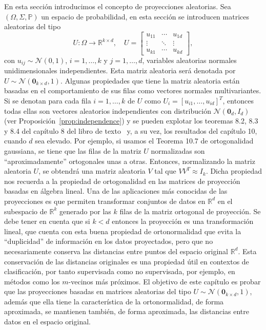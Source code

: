 En esta sección introducimos el concepto de proyecciones aleatorias.
Sea $\left(\Omega,\Sigma,\mathbb{P}\right)$ un espacio de
probabilidad, en esta sección se introducen matrices aleatorias del
tipo
\begin{equation*}
	U\colon\Omega\to\mathbb{R}^{k\times d},\quad
	U=
	\begin{bmatrix}
		u_{11} & \cdots & u_{1d} \\
		\vdots & \ddots & \vdots \\
		u_{k1} & \cdots & u_{kd}
	\end{bmatrix},
\end{equation*}
con $u_{ij}\sim\mathcal{N}\left(0,1\right)$, $i=1,\dotsc, k$ y
$j=1,\dotsc,d$, variables aleatorias normales unidimensionales
independientes.
Esta matriz aleatoria será denotada por
$U\sim\mathcal{N}\left(\symbf{0}_{k\times d},1\right)$.
Algunas propiedades que tiene la matriz aleatoria están basadas en el
comportamiento de sus filas como vectores normales multivariantes.
Si se denotan para cada fila $i=1,\dotsc,k$ de $U$ como
$U_{i}={\left[u_{i1},\dotsc,u_{id}\right]}^{T}$, entonces todas
ellas son vectores aleatorios independientes con distribución
$\mathcal{N}\left(\symbf{0}_{d},I_{d}\right)$
(ver Proposición~\ref{prop:independence}) y se pueden explotar los
teoremas 8.2, 8.3 y 8.4 del capítulo 8 del libro de
texto~\cite{Wegner2024} y, a su vez, los resultados del capítulo 10,
cuando $d$ sea elevado.
Por ejemplo, si usamos el Teorema 10.7 de ortogonalidad gaussiana, se
tiene que las filas de la matriz $U$ normalizadas son
``aproximadamente'' ortogonales unas a otras.
Entonces, normalizando la matriz aleatoria $U$, se obtendrá una
matriz aleatoria $V$ tal que $VV^{T}≈I_{k}$.
Dicha propiedad nos recuerda a la propiedad de ortogonalidad en las
matrices de proyección basadas en álgebra lineal.
Una de las aplicaciones más conocidas de las proyecciones es que
permiten transformar conjuntos de datos en $\mathbb{R}^{d}$ en el
subespacio de $\mathbb{R}^{k}$ generado por las $k$ filas de la
matriz ortogonal de proyección.
Se debe tener en cuenta que si $k<d$ entonces la proyección es una
transformación lineal, que cuenta con esta buena propiedad de
ortonormalidad que evita la ``duplicidad'' de información en los
datos proyectados, pero que no necesariamente conserva las distancias
entre puntos del espacio original $\mathbb{R}^{d}$.
Esta conservación de las distancias originales es una propiedad útil
en contextos de clasificación, por tanto supervisada como no
supervisada, por ejemplo, en métodos como los $m$-vecinos más
próximos.
El objetivo de este capítulo es probar que las proyecciones basadas
en matrices aleatorias del tipo
$U\sim\mathcal{N}\left(\symbf{0}_{k\times d},1\right)$, además que
ella tiene la característica de la ortonormalidad, de forma
aproximada, se mantienen también, de forma aproximada, las distancias
entre datos en el espacio original.

